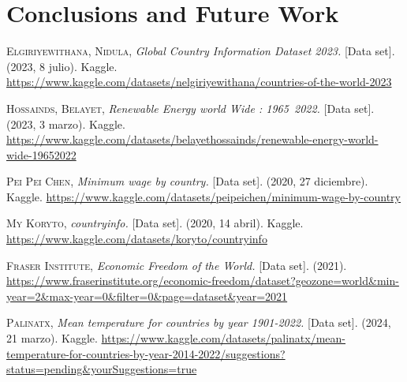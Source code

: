 \documentclass[fleqn,11pt]{article}
\begin{document}


\section{Conclusions and Future Work}

\newpage
\begin{thebibliography}{10}
	
 \textsc{Elgiriyewithana, Nidula}, \textit{Global Country Information Dataset 2023.} [Data set]. (2023, 8 julio). Kaggle. \newline
\small{\url{https://www.kaggle.com/datasets/nelgiriyewithana/countries-of-the-world-2023}}

 \textsc{Hossainds, Belayet}, \textit{Renewable Energy world Wide : 1965~2022.} [Data set]. (2023, 3 marzo). Kaggle. \newline
\small{\url{https://www.kaggle.com/datasets/belayethossainds/renewable-energy-world-wide-19652022}}

 \textsc{Pei Pei Chen}, \textit{Minimum wage by country.} [Data set]. (2020, 27 diciembre). Kaggle. \newline
\small{\url{https://www.kaggle.com/datasets/peipeichen/minimum-wage-by-country}}

 \textsc{My Koryto}, \textit{countryinfo.} [Data set]. (2020, 14 abril). Kaggle. \newline
\small{\url{https://www.kaggle.com/datasets/koryto/countryinfo}}

 \textsc{Fraser Institute}, \textit{Economic Freedom of the World.} [Data set]. (2021). \newline
\small{\url{https://www.fraserinstitute.org/economic-freedom/dataset?geozone=world&min-year=2&max-year=0&filter=0&page=dataset&year=2021}}

 \textsc{Palinatx}, \textit{Mean temperature for countries by year 1901-2022.} [Data set]. (2024, 21 marzo). Kaggle. \newline
\small{\url{https://www.kaggle.com/datasets/palinatx/mean-temperature-for-countries-by-year-2014-2022/suggestions?status=pending&yourSuggestions=true}}


\end{thebibliography}
\end{document}
